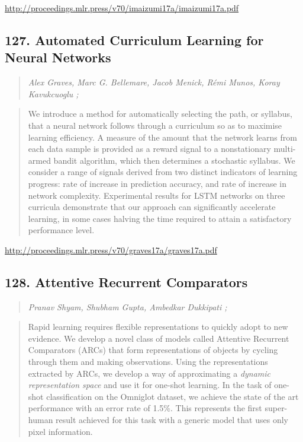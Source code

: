 \documentclass{article}
\begin{document}
\href{http://proceedings.mlr.press/v70/imaizumi17a/imaizumi17a.pdf}{http://proceedings.mlr.press/v70/imaizumi17a/imaizumi17a.pdf}

\subsection{127. Automated Curriculum Learning for Neural Networks}

\begin{quote}
\footnotesize{\textit{Alex Graves, Marc G. Bellemare, Jacob Menick, Rémi Munos, Koray Kavukcuoglu ;}}
\end{quote}

\begin{quote}
    We introduce a method for automatically selecting the path, or syllabus, that a neural network follows through a curriculum so as to maximise learning efficiency. A measure of the amount that the network learns from each data sample is provided as a reward signal to a nonstationary multi-armed bandit algorithm, which then determines a stochastic syllabus. We consider a range of signals derived from two distinct indicators of learning progress: rate of increase in prediction accuracy, and rate of increase in network complexity. Experimental results for LSTM networks on three curricula demonstrate that our approach can significantly accelerate learning, in some cases halving the time required to attain a satisfactory performance level.  \end{quote}

\href{http://proceedings.mlr.press/v70/graves17a/graves17a.pdf}{http://proceedings.mlr.press/v70/graves17a/graves17a.pdf}

\subsection{128. Attentive Recurrent Comparators}

\begin{quote}
\footnotesize{\textit{Pranav Shyam, Shubham Gupta, Ambedkar Dukkipati ;}}
\end{quote}

\begin{quote}
    Rapid learning requires flexible representations to quickly adopt to new evidence. We develop a novel class of models called Attentive Recurrent Comparators (ARCs) that form representations of objects by cycling through them and making observations. Using the representations extracted by ARCs, we develop a way of approximating a \textit{dynamic representation space} and use it for one-shot learning. In the task of one-shot classification on the Omniglot dataset, we achieve the state of the art performance with an error rate of 1.5\%. This represents the first super-human result achieved for this task with a generic model that uses only pixel information.  \end{quote}
\end{document}
